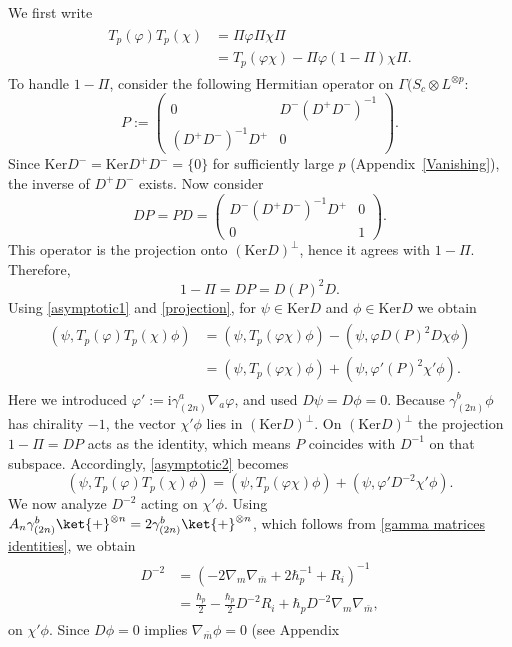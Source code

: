 \documentclass[12pt]{article}
\newcommand{\im}{\mathrm{i}}
\newcommand\eq[1]{\begin{equation}#1\end{equation}}
\newcommand\als[1]{\begin{align}\begin{split}#1\end{split}\end{align}}
\theoremstyle{definition} %
\theoremstyle{plain} %
\theoremstyle{remark} %
\theoremstyle{underline}
\begin{document}
We first write
\als{
    \label{asymptotic1}
    T_p(\varphi)T_p(\chi) &= \Pi \varphi \Pi \chi \Pi \\
    &= T_p(\varphi \chi) - \Pi \varphi (1-\Pi) \chi \Pi.
}
To handle $1-\Pi$, consider the following Hermitian operator on
$\Gamma(S_c \otimes L^{\otimes p}$:
\eq{
    P :=
    \left(
    \begin{array}{cc}
        0 & D^{-} (D^{+} D^{-})^{-1} \\
        (D^{+} D^{-})^{-1} D^{+} & 0
    \end{array}
    \right).
}
Since $\mathrm{Ker}D^{-} = \mathrm{Ker}D^{+} D^{-} = \{0\}$ for sufficiently
large $p$ (Appendix~\ref{Vanishing}), the inverse of $D^{+}D^{-}$ exists.
Now consider
\eq{
\label{D-P identity}
D P = P D =
    \left(
    \begin{array}{cc}
         D^{-} (D^{+} D^{-})^{-1} D^{+}  & 0\\
        0 & 1
    \end{array}
    \right).
}
This operator is the projection onto $(\mathrm{Ker}D)^{\perp}$, hence it agrees
with $1-\Pi$.
Therefore,
\eq{
    \label{projection}
    1-\Pi = D P = D (P)^2 D.
}
Using \eqref{asymptotic1} and \eqref{projection}, for
$\psi \in \mathrm{Ker}D$ and $\phi \in \mathrm{Ker}D$ we obtain
\als{
    \label{asymptotic2}
    (\psi,T_p(\varphi) T_p(\chi) \phi) &= (\psi,T_p(\varphi \chi) \phi) - (\psi,\varphi D (P)^2 D \chi \phi)\\
    &= (\psi,T_p(\varphi \chi) \phi) + (\psi, \varphi'  (P)^2 \chi' \phi).
    }
Here we introduced $\varphi' := \im  \gamma_{(2n)}^a\nabla_a \varphi$, and used
$D\psi=D\phi=0$.
Because $\gamma_{(2n)}^b\phi$ has chirality $-1$, the vector $\chi'\phi$ lies in
$(\mathrm{Ker}D)^{\perp}$.
On $(\mathrm{Ker}D)^{\perp}$ the projection $1-\Pi=DP$ acts as the identity,
which means $P$ coincides with $D^{-1}$ on that subspace.
Accordingly, \eqref{asymptotic2} becomes
\eq{
    \label{asymptotic3}
    (\psi,T_p(\varphi) T_p(\chi) \phi) = (\psi,T_p(\varphi \chi) \phi) + (\psi, \varphi' D^{-2} \chi' \phi).
}
We now analyze $D^{-2}$ acting on $\chi'\phi$.
Using $A_n \gamma_{(2n)}^b \ket{+}^{\otimes n} = 2 \gamma_{(2n)}^b \ket{+}^{\otimes n}$,
which follows from \eqref{gamma matrices identities}, we obtain
\als{
    \label{asymptotic4}
    D^{-2} &= \left(-2 \nabla_m \nabla_{\bar m} + 2\hbar_p^{-1} + R_i\right)^{-1} \\
    &= \frac{\hbar_p}{2} - \frac{\hbar_p}{2} D^{-2} R_i + \hbar_p D^{-2}  \nabla_m \nabla_{\bar m},
}
on $\chi'\phi$.
Since $D\phi=0$ implies $\nabla_{\bar m}\phi=0$ (see Appendix
\end{document}
